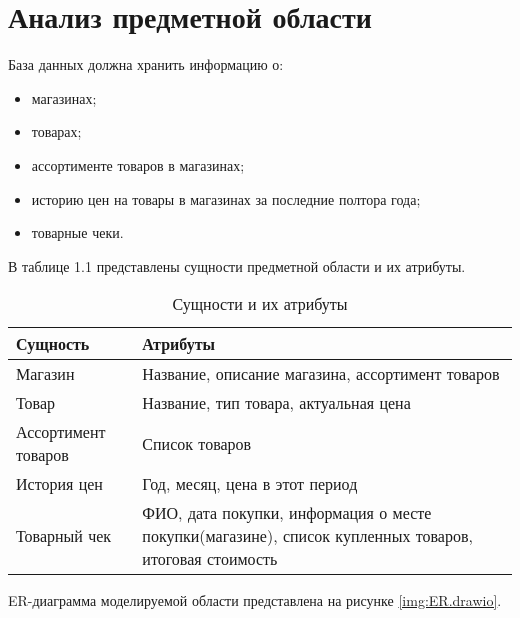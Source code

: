 \documentclass{bmstu}
\begin{document}
\section{Анализ предметной области}

База данных должна хранить информацию о:

\begin{itemize}
	\item магазинах;
	\item товарах;
	\item ассортименте товаров в магазинах;
	\item историю цен на товары в магазинах за последние полтора года;
	\item товарные чеки.
\end{itemize}

В таблице 1.1 представлены сущности предметной области и их атрибуты.

\begin{table}[H]
	\caption{Сущности и их атрибуты}
	\begin{center}
		\begin{tabular}{| l | p{11 cm} |} 
			\hline
			
			\textbf{Сущность} & \textbf{Атрибуты} \\  
			
			\hline
			
			Магазин & Название, описание магазина, ассортимент товаров \\
			
			\hline
			
			Товар & Название, тип товара, актуальная цена \\
			
			\hline
			
			Ассортимент товаров & Список товаров \\
			
			\hline
			
			История цен & Год, месяц, цена в этот период \\
			
			\hline
			
			Товарный чек & ФИО, дата покупки, информация о месте покупки(магазине), список купленных товаров, итоговая стоимость \\
			\hline
		\end{tabular}
	\end{center}
\end{table}

ER-диаграмма моделируемой области представлена на рисунке \ref{img:ER.drawio}.
\end{document}

